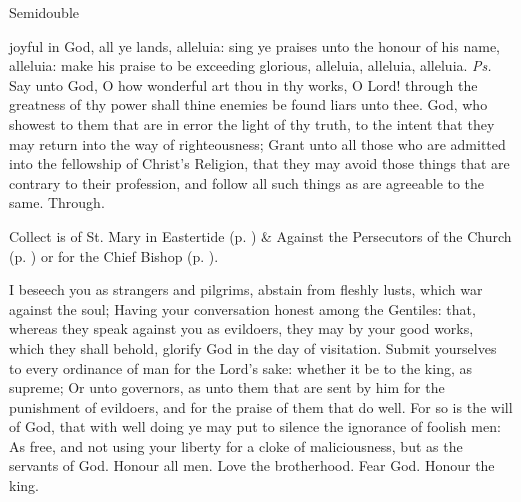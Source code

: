 \begin{inhead}
    {Semidouble}
\end{inhead}

\properantiphonfix

\introit
{} joyful in God, all ye lands, alleluia: sing ye praises unto the honour of his name, alleluia: make his praise to be exceeding glorious, alleluia, alleluia, alleluia. \textit{Ps.} Say unto God, O how wonderful art thou in thy works, O Lord! through the greatness of thy power shall thine enemies be found liars unto thee.
\collect
{} God, who showest to them that are in error the light of thy truth, to the intent that they may return into the way of righteousness; Grant unto all those who are admitted into the fellowship of Christ's Religion, that they may avoid those things that are contrary to their profession, and follow all such things as are agreeable to the same. Through.
\begin{rubric}
     Collect is of St. Mary in Eastertide (p. \pageref{SPMaryInEaster}) \&  Against the Persecutors of the Church (p. \pageref{SPAgainst}) or for the Chief Bishop (p. \pageref{SPChiefBishop}).
\end{rubric}
 I beseech you as strangers and pilgrims, abstain from fleshly lusts, which war against the soul; Having your conversation honest among the Gentiles: that, whereas they speak against you as evildoers, they may by your good works, which they shall behold, glorify God in the day of visitation. Submit yourselves to every ordinance of man for the Lord's sake: whether it be to the king, as supreme; Or unto governors, as unto them that are sent by him for the punishment of evildoers, and for the praise of them that do well. For so is the will of God, that with well doing ye may put to silence the ignorance of foolish men: As free, and not using your liberty for a cloke of maliciousness, but as the servants of God. Honour all men. Love the brotherhood. Fear God. Honour the king.
